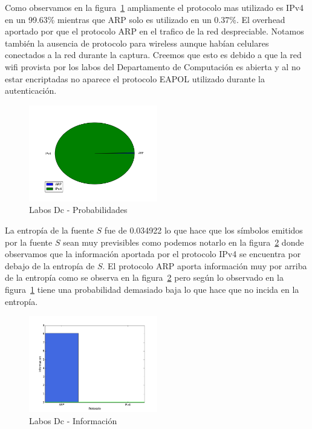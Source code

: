 \documentclass[final,inline,narroweqnarray,a4paper]{ieee}
\begin{document}
Como observamos en la figura~\ref{torta:labosDcS} ampliamente el protocolo mas utilizado es IPv4 en un 99.63\% mientras que ARP solo es utilizado en un 0.37\%. 
El overhead aportado por que el protocolo ARP en el trafico de la red despreciable.
Notamos también la ausencia de protocolo para wireless aunque habían celulares conectados a la red durante la captura. Creemos que esto es debido a que la red wifi provista por los labos del Departamento de Computación es abierta y al no estar encriptadas no aparece el protocolo EAPOL utilizado durante la autenticación. 

\begin{figure}[H]
    \begin{center}
        \includegraphics[width=0.5\textwidth]{plot/laboDcS-pie.png}
        \caption{Labos Dc - Probabilidades}
        \label{torta:labosDcS}
    \end{center}
\end{figure}

La entropía de la fuente $S$ fue de 0.034922 lo que hace que los símbolos emitidos por la fuente $S$ sean muy previsibles como podemos notarlo en la figura~\ref{histo:laboDcS} donde observamos que la información aportada por el protocolo IPv4 se encuentra por debajo de la entropía de $S$. El protocolo ARP aporta información muy por arriba de la entropía como se observa en la figura~\ref{histo:laboDcS} pero según lo observado en la figura~\ref{torta:labosDcS} tiene una probabilidad demasiado baja lo que hace que no incida en la entropía.

\begin{figure}[H]
    \begin{center}
        \includegraphics[width=0.5\textwidth]{plot/laboDcS-bar.png}
        \caption{Labos Dc - Información}
        \label{histo:laboDcS}
    \end{center}
\end{figure}
\end{document}
